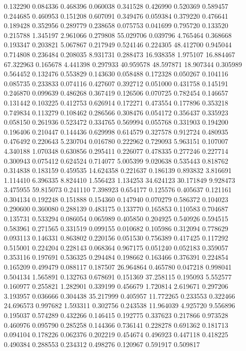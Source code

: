 0.132290
0.084336
0.468396
0.060038
0.341528
0.426990
0.520369
0.589457
0.244685
0.460953
0.151208
0.607091
0.349476
0.059384
0.379220
0.476641
0.189428
0.352956
0.289779
0.238658
0.075753
0.041699
0.795720
0.133520
0.215788
1.345197
2.961066
0.279808
55.029706
0.039796
4.765464
0.368668
0.193347
0.203821
5.067867
0.217949
0.524146
0.224305
48.412700
0.945044
0.714808
0.236484
0.208035
8.931731
0.288473
16.938358
1.975107
16.884467
67.322963
0.165678
4.441398
0.297933
40.959578
48.597871
18.907344
0.305989
0.564452
0.132476
0.553829
0.143630
0.058488
0.172328
0.050267
0.104116
0.085735
0.233833
0.074116
0.427607
0.392712
0.051000
0.431758
0.145191
0.246870
0.099639
0.486268
0.367419
0.126506
0.070725
0.782454
0.146657
0.131442
0.103225
0.412753
0.626914
0.172271
0.473554
0.177896
0.353218
0.749834
0.113279
0.108462
0.286566
0.308476
0.054172
0.356437
0.335923
0.058150
0.261936
0.523472
0.334765
0.569994
0.055768
0.331903
0.194200
0.196406
0.210447
0.144436
0.629998
0.614579
0.327578
0.912724
0.480935
0.476492
0.220643
5.230704
0.016780
0.222962
0.729093
5.963151
0.107007
4.340188
1.070348
0.630856
0.295411
0.226077
0.478335
0.277246
0.227714
0.300943
0.075412
0.624524
0.714077
5.005399
9.020638
0.535443
0.818762
0.314838
0.183159
0.459535
14.624358
0.221637
0.186139
0.893832
3.816691
1.114410
6.396335
8.824410
1.556423
1.134253
34.624123
30.171849
9.928473
3.475955
59.815073
0.241110
7.398923
0.654177
0.125576
0.405637
0.121161
0.304134
0.192248
0.151888
0.154360
0.147940
0.070279
0.586372
0.104023
0.290600
0.360080
0.288139
0.483175
0.133770
0.165853
0.110583
0.704687
0.135731
0.533294
0.086054
0.065989
0.405850
0.204925
0.540926
0.594515
0.583961
0.271565
0.331519
0.099155
0.010682
0.105986
0.312094
0.778629
0.093113
0.146331
0.863802
0.220156
0.051530
0.756389
0.417425
0.117292
0.515001
0.224204
0.228143
0.068364
0.967175
0.051240
0.052183
0.359057
0.353116
0.197691
0.536325
0.294484
0.198662
0.163466
0.376391
0.224854
0.165209
0.499479
0.088117
0.187507
26.964864
0.465780
0.047218
0.998041
0.504134
1.565891
0.132763
0.678691
0.151369
37.258115
0.195093
5.552577
0.160977
0.255821
1.282901
0.339199
0.456679
1.720814
2.619671
0.297206
3.193957
0.036666
0.304438
35.217999
0.405957
11.772265
0.233553
0.322466
24.696573
0.997682
1.593311
0.302756
0.243538
11.964039
4.925720
9.556896
0.195037
0.574289
0.432266
0.146415
0.192775
0.337623
0.217866
0.973528
0.460976
0.095790
0.285258
0.144366
0.736141
0.228278
0.691362
0.181713
0.094104
0.178226
0.062376
0.202219
0.454674
0.496923
0.447118
0.418225
0.490384
0.288553
0.234312
0.498276
0.120967
0.591917
0.509817
